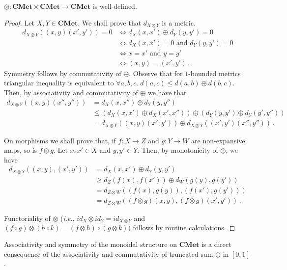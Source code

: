 \documentclass[a4paper,UKenglish,cleveref, autoref, thm-restate]{lipics-v2021}
\newcommand{\ie}{\textit{i.e.}}
\newcommand{\cat}[1]{\mathbf{#1}}
\newcommand{\CMet}{\cat{CMet}}
\newcommand{\mprod}{\otimes}
\newcommand{\uinterval}{[0,1]}
\begin{document}
\begin{proposition}
$\mprod \colon \CMet \times \CMet \to \CMet$ is well-defined.
\end{proposition}
\begin{proof}
Let $X, Y \in \CMet$. We shall prove that $d_{X \mprod Y}$ is a metric. %
\begin{align*}
 d_{X \mprod Y}((x,y)(x',y')) = 0 
 &\iff d_X(x,x') \oplus d_Y(y,y') = 0 \\
 &\iff d_X(x,x') = 0 \text{ and } d_Y(y,y') = 0 \\
 &\iff x = x' \text{ and } y = y' \\
 &\iff (x,y) = (x',y') \,.
\end{align*}
Symmetry follows by commutativity of $\oplus$. Observe that for $1$-bounded metrics triangular inequality is equivalent to $\forall a,b,c.\; d(a,c) \leq d(a,b) \oplus d(b,c)$. Then, by associativity and commutativity of $\oplus$ we have that
\begin{align*}
 d_{X \mprod Y}((x,y)(x'',y'')) 
 &= d_X(x,x'') \oplus d_Y(y,y'')  \\
 &\leq (d_X(x,x') \oplus d_X(x',x'')) \oplus (d_Y(y,y') \oplus d_Y(y',y'')) \\
 &= d_{X \mprod Y}((x,y)(x',y')) \oplus d_{X \mprod Y}((x',y')(x'',y'')) \,.
\end{align*}

On morphisms we shall prove that, if $f \colon X \to Z$ and $g \colon Y \to W$ are non-expansive maps, so is $f \mprod g$. Let $x,x' \in X$ and $y,y' \in Y$. Then, by monotonicity of $\oplus$, we have 
\begin{align*}
d_{X \mprod Y}((x,y),(x',y')) %
&= d_X(x,x') \oplus d_Y(y,y')  \\
&\geq d_Z(f(x),f(x')) \oplus d_W(g(y),g(y')) \\
&= d_{Z \mprod W}((f(x),g(y)),(f(x'),g(y')))  \\
&= d_{Z \mprod W}((f \mprod g)(x,y),(f \mprod g)(x',y')) \,. 
\end{align*}

Functoriality of $\mprod$ (\ie, $id_X \mprod id_Y = id_{X \mprod Y}$ and 
$(f \circ g) \mprod (h \circ k) = (f \mprod h) \circ (g \mprod k))$ follows by routine calculations.
\end{proof}

Associativity and symmetry of the monoidal structure on $\CMet$ is a direct consequence of the associativity and commutativity of truncated sum $\oplus$ in $\uinterval$.
\end{document}
